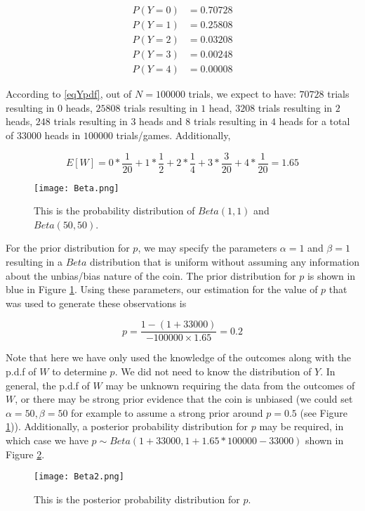 \documentclass{article}
\begin{document}
\begin{flushleft}
\begin{equation} \label{eqYpdf}
\begin{split}
P(Y=0) &= 0.70728 \\
P(Y=1) &= 0.25808 \\
P(Y=2) &= 0.03208 \\
P(Y=3) &= 0.00248 \\
P(Y=4) &= 0.00008
\end{split}
\end{equation}

According to \ref{eqYpdf}, out of $N=100000$ trials, we expect to have: $70728$ trials resulting in $0$ heads, $25808$ trials resulting in $1$ head, $3208$ trials resulting in $2$ heads, $248$ trials resulting in $3$ heads and $8$ trials resulting in $4$ heads for a total of $33000$ heads in $100000$ trials/games. Additionally, 

$$E[W] = 0*\frac{1}{20} + 1*\frac{1}{2} + 2*\frac{1}{4} + 3*\frac{3}{20} + 4*\frac{1}{20}=1.65$$

\begin{figure}
    \centering
    \texttt{[image: Beta.png]}
    \caption{This is the probability distribution of $Beta(1,1)$ and $Beta(50,50)$.}
    \label{fig:Beta}
\end{figure}

For the prior distribution for $p$, we may specify the parameters $\alpha=1$ and $\beta=1$ resulting in a $Beta$ distribution that is uniform without assuming any information about the unbias/bias nature of the coin. The prior distribution for $p$ is shown in blue in Figure \ref{fig:Beta}. Using these parameters, our estimation for the value of $p$ that was used to generate these observations is

$$p = \frac{1-(1+33000)}{-100000 \times 1.65} = 0.2$$

Note that here we have only used the knowledge of the outcomes along with the p.d.f of $W$ to determine $p$. We did not need to know the distribution of $Y$. In general, the p.d.f of $W$ may be unknown requiring the data from the outcomes of $W$, or there may be strong prior evidence that the coin is unbiased (we could set $\alpha = 50,\beta = 50$ for example to assume a strong prior around $p=0.5$ (see Figure \ref{fig:Beta})). Additionally, a posterior probability distribution for $p$ may be required, in which case we have $p \sim Beta(1+33000,1+1.65*100000-33000)$ shown in Figure \ref{fig:Beta2}.

\begin{figure}
    \centering
    \texttt{[image: Beta2.png]}
    \caption{This is the posterior probability distribution for $p$.}
    \label{fig:Beta2}
\end{figure}

\end{flushleft}
\end{document}
